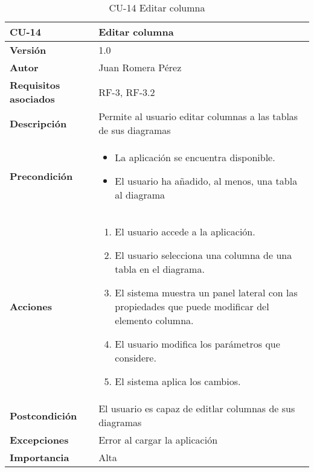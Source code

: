 \begin{table}[p]
    \centering
    \begin{tabularx}{\linewidth}{ p{} p{}}
		\toprule
		\textbf{CU-14}    & \textbf{Editar columna}\\
		\toprule
		\textbf{Versión}              & 1.0    \\
		\textbf{Autor}                & Juan Romera Pérez \\
		\textbf{Requisitos asociados} & RF-3, RF-3.2 \\
		\textbf{Descripción}          & Permite al usuario editar columnas a las tablas de sus diagramas \\
		\textbf{Precondición}         & \begin{itemize}
		    \item La aplicación se encuentra disponible.
            \item El usuario ha añadido, al menos, una tabla al diagrama
		\end{itemize} \\
		\textbf{Acciones}             &
		\begin{enumerate}
			\def\labelenumi{\arabic{enumi}.}
			\tightlist
			\item El usuario accede a la aplicación.
            \item El usuario selecciona una columna de una tabla en el diagrama.
            \item El sistema muestra un panel lateral con las propiedades que puede modificar del elemento columna.
            \item El usuario modifica los parámetros que considere.
            \item El sistema aplica los cambios.
		\end{enumerate}\\
		\textbf{Postcondición}        & El usuario es capaz de editlar columnas de sus diagramas \\
		\textbf{Excepciones}          & Error al cargar la aplicación \\
		\textbf{Importancia}          & Alta \\
		\bottomrule
    \end{tabularx}
    \caption{CU-14 Editar columna}
\end{table}

